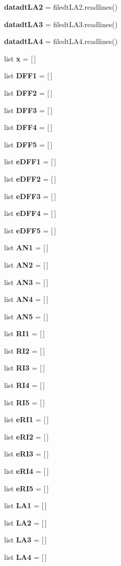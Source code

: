 \begin{DoxyCompactItemize}
\textbf{ datadt\+L\+A2} = filedt\+L\+A2.\+readlines()
\item 
\textbf{ datadt\+L\+A3} = filedt\+L\+A3.\+readlines()
\item 
\textbf{ datadt\+L\+A4} = filedt\+L\+A4.\+readlines()
\item 
list \textbf{ x} = [$\,$]
\item 
list \textbf{ D\+F\+F1} = [$\,$]
\item 
list \textbf{ D\+F\+F2} = [$\,$]
\item 
list \textbf{ D\+F\+F3} = [$\,$]
\item 
list \textbf{ D\+F\+F4} = [$\,$]
\item 
list \textbf{ D\+F\+F5} = [$\,$]
\item 
list \textbf{ e\+D\+F\+F1} = [$\,$]
\item 
list \textbf{ e\+D\+F\+F2} = [$\,$]
\item 
list \textbf{ e\+D\+F\+F3} = [$\,$]
\item 
list \textbf{ e\+D\+F\+F4} = [$\,$]
\item 
list \textbf{ e\+D\+F\+F5} = [$\,$]
\item 
list \textbf{ A\+N1} = [$\,$]
\item 
list \textbf{ A\+N2} = [$\,$]
\item 
list \textbf{ A\+N3} = [$\,$]
\item 
list \textbf{ A\+N4} = [$\,$]
\item 
list \textbf{ A\+N5} = [$\,$]
\item 
list \textbf{ R\+I1} = [$\,$]
\item 
list \textbf{ R\+I2} = [$\,$]
\item 
list \textbf{ R\+I3} = [$\,$]
\item 
list \textbf{ R\+I4} = [$\,$]
\item 
list \textbf{ R\+I5} = [$\,$]
\item 
list \textbf{ e\+R\+I1} = [$\,$]
\item 
list \textbf{ e\+R\+I2} = [$\,$]
\item 
list \textbf{ e\+R\+I3} = [$\,$]
\item 
list \textbf{ e\+R\+I4} = [$\,$]
\item 
list \textbf{ e\+R\+I5} = [$\,$]
\item 
list \textbf{ L\+A1} = [$\,$]
\item 
list \textbf{ L\+A2} = [$\,$]
\item 
list \textbf{ L\+A3} = [$\,$]
\item 
list \textbf{ L\+A4} = [$\,$]

\end{DoxyCompactItemize}
